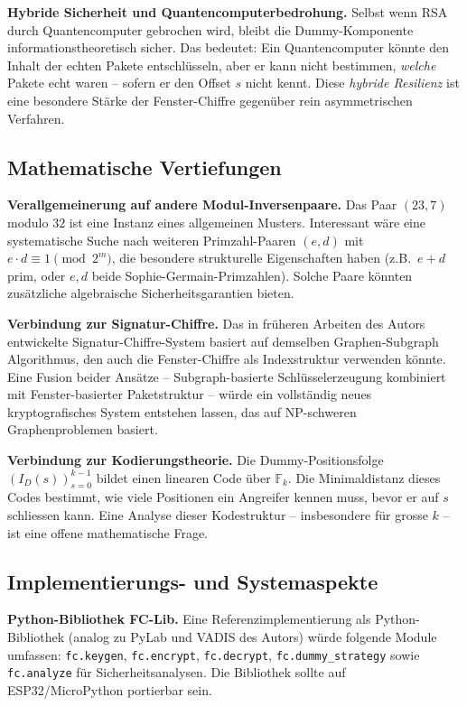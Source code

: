 ﻿\documentclass[12pt, a4paper]{article}
\theoremstyle{plain}
\theoremstyle{definition}
\theoremstyle{remark}
\begin{document}
\textbf{Hybride Sicherheit und Quantencomputerbedrohung.}
Selbst wenn RSA durch Quantencomputer gebrochen wird, bleibt die
Dummy-Komponente informationstheoretisch sicher. Das bedeutet: Ein
Quantencomputer k\"onnte den Inhalt der echten Pakete entschl\"usseln,
aber er kann nicht bestimmen, \emph{welche} Pakete echt waren --
sofern er den Offset $s$ nicht kennt. Diese \emph{hybride Resilienz}
ist eine besondere St\"arke der Fenster-Chiffre gegen\"uber rein
asymmetrischen Verfahren.

\subsection{Mathematische Vertiefungen}

\textbf{Verallgemeinerung auf andere Modul-Inversenpaare.}
Das Paar $(23, 7)$ modulo $32$ ist eine Instanz eines allgemeinen Musters.
Interessant w\"are eine systematische Suche nach weiteren Primzahl-Paaren
$(e, d)$ mit $e \cdot d \equiv 1 \pmod{2^m}$, die besondere
strukturelle Eigenschaften haben (z.B.\ $e + d$ prim, oder $e, d$ beide
Sophie-Germain-Primzahlen). Solche Paare k\"onnten zus\"atzliche
algebraische Sicherheitsgarantien bieten.

\textbf{Verbindung zur Signatur-Chiffre.}
Das in fr\"uheren Arbeiten des Autors entwickelte Signatur-Chiffre-System
\cite{epp2026sigchiffre} basiert auf demselben Graphen-Subgraph Algorithmus,
den auch die Fenster-Chiffre als Indexstruktur verwenden k\"onnte.
Eine Fusion beider Ans\"atze -- Subgraph-basierte Schl\"usselerzeugung
kombiniert mit Fenster-basierter Paketstruktur -- w\"urde ein
vollst\"andig neues kryptografisches System entstehen lassen, das auf
NP-schweren Graphenproblemen basiert.

\textbf{Verbindung zur Kodierungstheorie.}
Die Dummy-Positionsfolge $(I_D(s))_{s=0}^{k-1}$ bildet einen linearen
Code \"uber $\mathbb{F}_k$. Die Minimaldistanz dieses Codes
bestimmt, wie viele Positionen ein Angreifer kennen muss, bevor er
auf $s$ schliessen kann. Eine Analyse dieser Kodestruktur -- insbesondere
f\"ur grosse $k$ -- ist eine offene mathematische Frage.

\subsection{Implementierungs- und Systemaspekte}

\textbf{Python-Bibliothek FC-Lib.}
Eine Referenzimplementierung als Python-Bibliothek (analog zu PyLab
und VADIS des Autors) w\"urde folgende Module umfassen:
\texttt{fc.keygen}, \texttt{fc.encrypt}, \texttt{fc.decrypt},
\texttt{fc.dummy\_strategy} sowie \texttt{fc.analyze} f\"ur
Sicherheitsanalysen. Die Bibliothek sollte auf ESP32/MicroPython portierbar sein.
\end{document}
